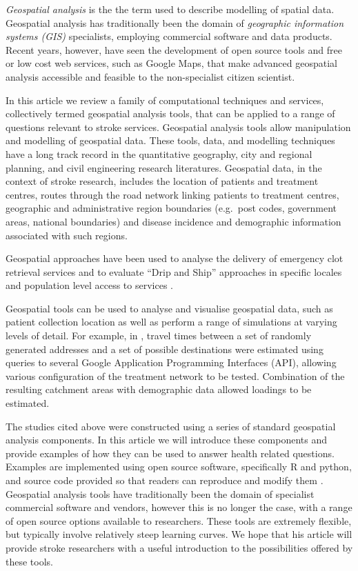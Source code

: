 \documentclass[utf8]{frontiersHLTH}
\begin{document}
{\em Geospatial analysis} is the the term used to describe modelling
of spatial data. Geospatial analysis has traditionally been the domain
of {\em geographic information systems (GIS)} specialists, employing
commercial software and data products. Recent years, however, have
seen the development of open source tools and free or low cost web
services, such as Google Maps, that make advanced geospatial analysis 
accessible and feasible to the non-specialist citizen scientist.

In this article we review a family of computational techniques and
services, collectively termed geospatial analysis tools, that can be
applied to a range of questions relevant to stroke services. Geospatial
analysis tools allow manipulation and modelling of geospatial data.
These tools, data, and modelling techniques have a long track record in
the quantitative geography, city and regional planning, and civil
engineering research literatures. Geospatial data, in the context of
stroke research, includes the location of patients and treatment
centres, routes through the road network linking patients to treatment
centres, geographic and administrative region boundaries (e.g.~post
codes, government areas, national boundaries) and disease incidence and
demographic information associated with such regions.

Geospatial approaches have been used to
analyse the delivery of emergency clot retrieval services
\cite{Phan_2017} and to evaluate ``Drip and Ship'' approaches in
specific locales \cite{Milne_2017} and population level
access to services \cite{Adeoye_2014}.

Geospatial tools can be used to analyse and visualise geospatial data,
such as patient collection location as well as perform a range of
simulations at varying levels of detail. For example, in
\cite{Phan_2017}, travel times between a set of randomly generated
addresses and a set of possible destinations were estimated using
queries to several Google Application Programming Interfaces (API),
allowing various configuration of the treatment network to be
tested. Combination of the resulting catchment areas with demographic
data allowed loadings to be estimated.

The studies cited above were constructed using a series of standard
geospatial analysis components. In this article we will introduce
these components and provide examples of how they can be used to
answer health related questions. Examples are implemented using open
source software, specifically R and python, and source code provided
so that readers can reproduce and modify them
\cite{R_Core_Team_2018,sanner1999python}. Geospatial analysis tools
have traditionally been the domain of specialist commercial software
and vendors, however this is no longer the case, with a range of open
source options available to researchers.  These tools are extremely
flexible, but typically involve relatively steep learning curves. We
hope that his article will provide stroke researchers with a useful
introduction to the possibilities offered by these tools.
\end{document}
